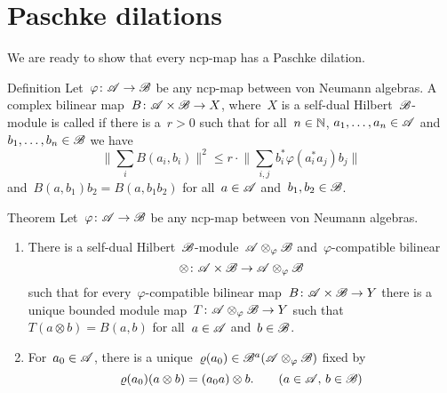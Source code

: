 \documentclass[b]{subfiles}
\begin{document}
\section{Paschke dilations}
\begin{parsec}%
\begin{point}%
    We are ready to show that every ncp-map has a Paschke dilation.
\end{point}
\begin{point}{Definition}%
    Let~$\varphi\colon \mathscr{A} \to \mathscr{B}$ be any ncp-map between
        von Neumann algebras.
    A complex bilinear map~$B \colon \mathscr{A} \times \mathscr{B} \to X$,
        where~$X$ is a self-dual Hilbert~$\mathscr{B}$-module is
        called 
        if there is a~$r > 0$
        such that for all~$n\in \mathbb{N}$, $a_1, \ldots, a_n \in \mathscr{A}$
        and~$b_1, \ldots, b_n \in \mathscr{B}$ we have
        \begin{equation}
            \bigl\| \sum_i B(a_i,b_i)\bigr\|^2
                \leq r \cdot \bigl\| \sum_{i,j} b_i^* \varphi(a_i^*a_j)b_j
                \bigr\| \label{phi-compatible}
        \end{equation}
        and~$B(a,b_1)b_2 = B(a,b_1b_2)$
        for all~$a \in \mathscr{A}$ and~$b_1,b_2 \in \mathscr{B}$.
\end{point}
\begin{point}{Theorem}%
    Let~$\varphi\colon \mathscr{A} \to \mathscr{B}$ be any ncp-map between
        von Neumann algebras.
\begin{enumerate}
    \item There is a self-dual Hilbert~$\mathscr{B}$-module~$\mathscr{A} \otimes_\varphi
            \mathscr{B}$ and~$\varphi$-compatible bilinear
    \begin{equation*}
        \otimes \colon \mathscr{A} \times \mathscr{B} \to \mathscr{A} \otimes_\varphi \mathscr{B}
    \end{equation*}
    such that for every~$\varphi$-compatible bilinear
    map~$B \colon \mathscr{A} \times \mathscr{B} \to Y$
    there is a unique bounded
    module map~$T\colon \mathscr{A} \otimes_\varphi \mathscr{B} \to Y$
    such that~$T(a \otimes b) = B(a,b)$ for all~$a \in \mathscr{A}$ and~$b \in \mathscr{B}$.
\item
    For~$a_0 \in \mathscr{A}$,
    there is a unique~$\varrho(a_0) \in \mathscr{B}^a(\mathscr{A} \otimes_\varphi \mathscr{B})$
            fixed by
            \begin{equation*}
                \varrho(a_0)(a\otimes b) = (a_0 a)\otimes b.
                    \text{\qquad ($a\in \scrA$, $b \in \scrB$)}

\end{equation*}
\end{enumerate}
\end{point}
\end{parsec}
\end{document}
